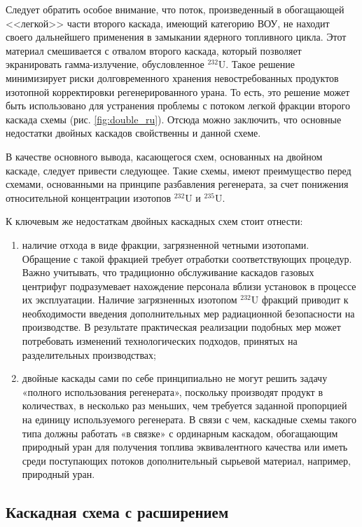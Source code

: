 Следует обратить особое внимание, что поток, произведенный в обогащающей <<легкой>> части второго каскада, имеющий категорию ВОУ, не находит своего дальнейшего применения в замыкании ядерного топливного цикла. Этот материал смешивается с отвалом второго каскада, который позволяет экранировать гамма-излучение, обусловленное $^{232}$U. Такое решение минимизирует риски долговременного хранения невостребованных продуктов изотопной корректировки регенерированного урана. То есть, это решение может быть использовано для устранения проблемы с потоком легкой фракции второго каскада схемы (рис. \ref{fig:double_ru}). Отсюда можно заключить, что основные недостатки двойных каскадов свойственны и данной схеме. 

В качестве основного вывода, касающегося схем, основанных на двойном каскаде, следует привести следующее. Такие схемы, имеют преимущество перед схемами, основанными на принципе разбавления регенерата, за счет понижения относительной концентрации изотопов  $^{232}$U и  $^{235}$U.

К ключевым же недостаткам двойных каскадных схем стоит отнести: 
\begin{enumerate}
  \item наличие отхода в виде фракции, загрязненной четными изотопами. Обращение с такой фракцией требует отработки соответствующих процедур. Важно учитывать, что традиционно обслуживание каскадов газовых центрифуг подразумевает нахождение персонала вблизи установок в процессе их эксплуатации. Наличие загрязненных изотопом $^{232}$U фракций приводит к необходимости введения дополнительных мер радиационной безопасности на производстве. В результате практическая реализации подобных мер может потребовать изменений технологических подходов, принятых на разделительных производствах;
  \item двойные каскады сами по себе принципиально не могут решить задачу «полного использования регенерата», поскольку производят продукт в количествах, в несколько раз меньших, чем требуется заданной пропорцией на единицу используемого регенерата. В связи с чем, каскадные схемы такого типа должны работать «в связке» с ординарным каскадом, обогащающим природный уран для получения топлива эквивалентного качества или иметь среди поступающих потоков дополнительный сырьевой материал, например, природный уран.
\end{enumerate}

\subsection{Каскадная схема с расширением}

